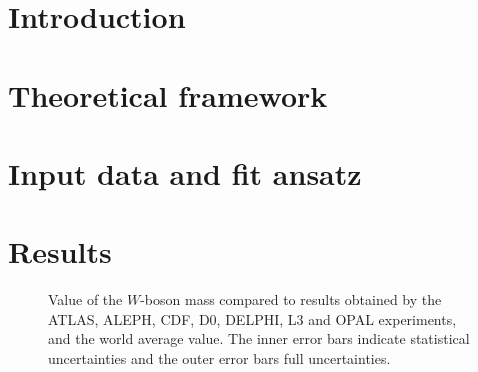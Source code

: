 \documentclass[12pt]{article}
\begin{document}

\section{Introduction}
%


\section{Theoretical framework}


\section{Input data and fit ansatz}


\section{Results}


\begin{figure}[tb]
  \begin{center}
    \textwidth
  \end{center}
  \caption{
    Value of the $W$-boson mass compared to results obtained by the ATLAS, ALEPH, CDF,
    D0, DELPHI, L3 and OPAL experiments, and the world average value.
    The inner error bars indicate statistical uncertainties and the
    outer error bars full uncertainties.
}
\label{fig:mW}
\end{figure}




\end{document}
